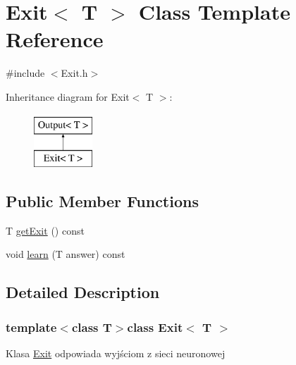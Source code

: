 \hypertarget{class_exit}{\section{\-Exit$<$ \-T $>$ \-Class \-Template \-Reference}
\label{class_exit}
}


{\ttfamily \#include $<$\-Exit.\-h$>$}

\-Inheritance diagram for \-Exit$<$ \-T $>$\-:\begin{figure}[H]
\begin{center}
\leavevmode
\includegraphics[height=2.000000cm]{class_exit}
\end{center}
\end{figure}
\subsection*{\-Public \-Member \-Functions}
\begin{DoxyCompactItemize}
\item 
\-T \hyperlink{class_exit_ace64923bf5842a32f0abbb413e0bc50f}{get\-Exit} () const 
\item 
void \hyperlink{class_exit_a7579d52eedde1485a1f812b4edad463c}{learn} (\-T answer) const 
\end{DoxyCompactItemize}


\subsection{\-Detailed \-Description}
\subsubsection*{template$<$class T$>$class Exit$<$ T $>$}

\-Klasa \hyperlink{class_exit}{\-Exit} odpowiada wyjściom z sieci neuronowej 

